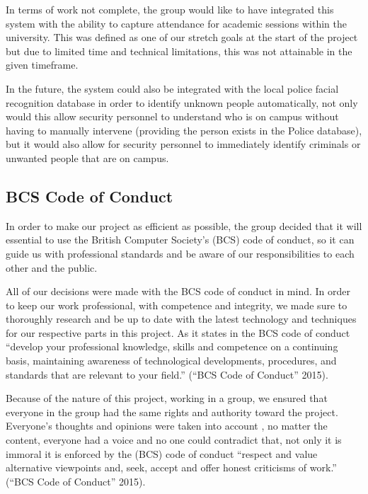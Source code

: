 \documentclass[
  english,
  a4paper,
,tablecaptionabove
]{scrartcl}
\begin{document}
In terms of work not complete, the group would like to have integrated
this system with the ability to capture attendance for academic sessions
within the university. This was defined as one of our stretch goals at
the start of the project but due to limited time and technical
limitations, this was not attainable in the given timeframe.

In the future, the system could also be integrated with the local police
facial recognition database in order to identify unknown people
automatically, not only would this allow security personnel to
understand who is on campus without having to manually intervene
(providing the person exists in the Police database), but it would also
allow for security personnel to immediately identify criminals or
unwanted people that are on campus.

\newpage

\hypertarget{bcs-code-of-conduct}{%
\subsection{BCS Code of Conduct}\label{bcs-code-of-conduct}}

In order to make our project as efficient as possible, the group decided
that it will essential to use the British Computer Society's (BCS) code
of conduct, so it can guide us with professional standards and be aware
of our responsibilities to each other and the public.

All of our decisions were made with the BCS code of conduct in mind. In
order to keep our work professional, with competence and integrity, we
made sure to thoroughly research and be up to date with the latest
technology and techniques for our respective parts in this project. As
it states in the BCS code of conduct \enquote{develop your professional
knowledge, skills and competence on a continuing basis, maintaining
awareness of technological developments, procedures, and standards that
are relevant to your field.} (``BCS Code of Conduct'' 2015).

Because of the nature of this project, working in a group, we ensured
that everyone in the group had the same rights and authority toward the
project. Everyone's thoughts and opinions were taken into account , no
matter the content, everyone had a voice and no one could contradict
that, not only it is immoral it is enforced by the (BCS) code of conduct
\enquote{respect and value alternative viewpoints and, seek, accept and
offer honest criticisms of work.} (``BCS Code of Conduct'' 2015).
\end{document}
